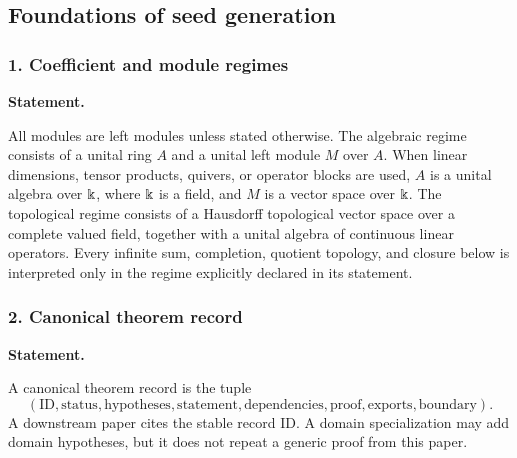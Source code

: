 \subsection{Foundations of seed generation}
\subsubsection*{1. Coefficient and module regimes}
\label{rec:PSC-I-D-COEFFICIENT-REGIME}
\textbf{Statement.}\par
All modules are left modules unless stated otherwise.  The algebraic regime consists of a unital ring $A$ and a unital left module $M$ over $A$.  When linear dimensions, tensor products, quivers, or operator blocks are used, $A$ is a unital algebra over $\Bbbk$, where $\Bbbk$ is a field, and $M$ is a vector space over $\Bbbk$.  The topological regime consists of a Hausdorff topological vector space over a complete valued field, together with a unital algebra of continuous linear operators.  Every infinite sum, completion, quotient topology, and closure below is interpreted only in the regime explicitly declared in its statement.
\subsubsection*{2. Canonical theorem record}
\label{rec:PSC-I-D-THEOREM-RECORD}
\textbf{Statement.}\par
A canonical theorem record is the tuple
\[
(\mathrm{ID},\mathrm{status},\mathrm{hypotheses},\mathrm{statement},
\mathrm{dependencies},\mathrm{proof},\mathrm{exports},\mathrm{boundary}).
\]
A downstream paper cites the stable record ID.  A domain specialization may add domain hypotheses, but it does not repeat a generic proof from this paper.
